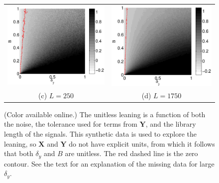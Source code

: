 \documentclass[a4paper,11pt,twocolumn]{article}
\begin{document}
\begin{figure}[ht]
\begin{tabular}{cc}
\includegraphics[scale=0.30]{SimpleIRexample_diffLpart3.eps} &
\includegraphics[scale=0.30]{SimpleIRexample_diffLpart4.eps} \\
(c) $L=250$ & (d) $L=1750$ \\
\end{tabular}
\caption{(Color available online.) The unitless leaning is a function of both the noise, the tolerance used for terms from $\mathbf{Y}$, and the library length of the signals.  This synthetic data is used to explore the leaning, so $\mathbf{X}$ and $\mathbf{Y}$ do not have explicit units, from which it follows that both $\delta_y$ and $B$ are unitless.  The red dashed line is the zero contour.  See the text for an explanation of the missing data for large $\delta_y$.}
\label{fig:IRexChangeL}
\end{figure}
\end{document}

